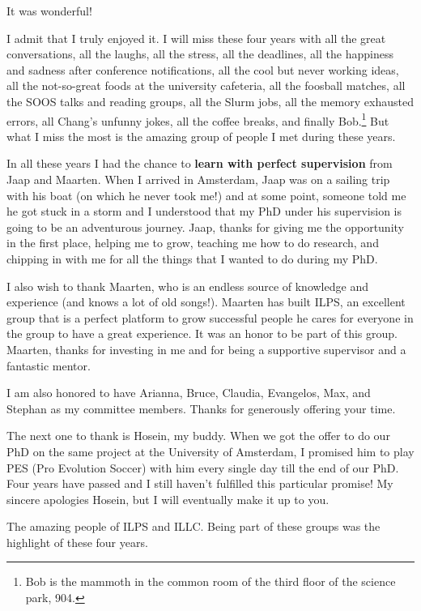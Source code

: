 \acknowledgments

It was wonderful! 

I admit that I truly enjoyed it. I will miss these four years with all the great conversations, all the laughs, all the stress, all the deadlines, all the happiness and sadness after conference notifications,  all the cool but never working ideas, all the not-so-great foods at the university cafeteria, all the foosball matches, all the SOOS talks and reading groups, all the Slurm jobs, all the memory exhausted errors, all Chang's unfunny jokes, all the coffee breaks, and finally Bob.\footnote{Bob is the mammoth in the common room of the third floor of the science park, 904.} But what I miss the most is the amazing group of people I met during these years.

In all these years I had the chance to \textbf{learn with perfect supervision} from Jaap and Maarten. 
When I arrived in Amsterdam, Jaap was on a sailing trip with his boat (on which he never took me!) and at some point, someone told me he got stuck in a storm and I understood that my PhD under his supervision is going to be an adventurous journey. Jaap, thanks for giving me the opportunity in the first place, helping me to grow, teaching me how to do research, and chipping in with me for all the things that I wanted to do during my PhD. 

I also wish to thank Maarten, who is an endless source of knowledge and experience (and knows a lot of old songs!). Maarten has built ILPS,  an excellent group that is a perfect platform to grow successful people he cares for everyone in the group to have a great experience. It was an honor to be part of this group. Maarten, thanks for investing in me and for being a supportive supervisor and a fantastic mentor. 

I am also honored to have Arianna, Bruce, Claudia, Evangelos, Max, and Stephan as my committee members. Thanks for generously offering your time.

The next one to thank is Hosein, my buddy. When we got the offer to do our PhD on the same project at the University of Amsterdam, I promised him to play PES (Pro Evolution Soccer) with him every single day till the end of our PhD. Four years have passed and I still haven't fulfilled this particular promise!  My sincere apologies Hosein, but I will eventually make it up to you.

The amazing people of ILPS and ILLC. Being part of these groups was the highlight of these four years. 

